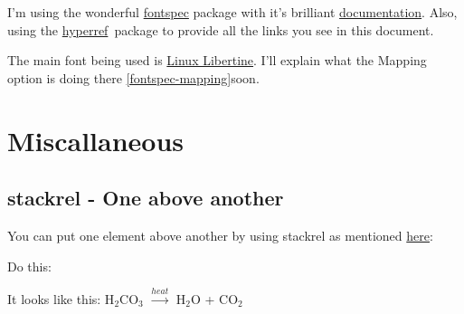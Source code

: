 \documentclass[a4paper,extrafontsizes,12pt,twoside,openany]{memoir}
\newcommand{\showpart}[1]{\noindent}
\newcommand{\HyperRef}{\href{http://www.tug.org/applications/hyperref/manual.html}{hyperref}\ }
\begin{document}
I'm using the wonderful \href{http://tug.ctan.org/cgi-bin/ctanPackageInformation.py?id=fontspec}{fontspec} package with
it's brilliant \href{http://tug.ctan.org/tex-archive/macros/xetex/latex/fontspec/fontspec.pdf}{documentation}. Also,
using the \HyperRef package to provide all the links you see in this document.

The main font being used is \href{http://linuxlibertine.sourceforge.net/}{Linux Libertine}. I'll explain what the
Mapping option is doing there \ref{fontspec-mapping}{soon}.

\showpart{OTHERPACKAGES}

\chapter{Miscallaneous}

\section{stackrel - One above another}

You can put one element above another by using stackrel as mentioned
\href{http://www.uz.ac.zw/science/maths/latex/stackrel.html}{here}:

Do this: \showpart{STACKREL}

It looks like this:
H$_2$CO$_3$ $\stackrel{heat}{\longrightarrow}$ H$_2$O + CO$_2$
\end{document}

